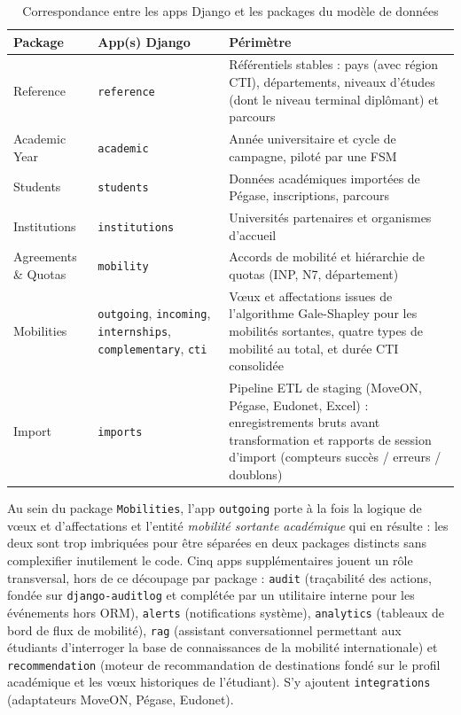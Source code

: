 \begin{table}[H]
\centering
\caption{Correspondance entre les apps Django et les packages du modèle de données}
\label{tab:domaines_apps}
\footnotesize
\renewcommand{\arraystretch}{1.4}
\begin{tabular}{|p{3.2cm}|p{3cm}|p{8.5cm}|}
\hline
\rowcolor{gray!20}
\textbf{Package} & \textbf{App(s) Django} & \textbf{Périmètre} \\
\hline
Reference & \texttt{reference} & Référentiels stables : pays (avec région CTI), départements, niveaux d'études (dont le niveau terminal diplômant) et parcours \\
\hline
Academic Year & \texttt{academic} & Année universitaire et cycle de campagne, piloté par une FSM \\
\hline
Students & \texttt{students} & Données académiques importées de Pégase, inscriptions, parcours \\
\hline
Institutions & \texttt{institutions} & Universités partenaires et organismes d'accueil \\
\hline
Agreements \& Quotas & \texttt{mobility} & Accords de mobilité et hiérarchie de quotas (INP, N7, département) \\
\hline
Mobilities & \texttt{outgoing}, \texttt{incoming}, \texttt{internships}, \texttt{complementary}, \texttt{cti} & Vœux et affectations issues de l'algorithme Gale-Shapley pour les mobilités sortantes, quatre types de mobilité au total, et durée CTI consolidée \\
\hline
Import & \texttt{imports} & Pipeline ETL de staging (MoveON, Pégase, Eudonet, Excel) : enregistrements bruts avant transformation et rapports de session d'import (compteurs succès / erreurs / doublons) \\
\hline
\end{tabular}
\end{table}

Au sein du package \texttt{Mobilities}, l'app \texttt{outgoing} porte à la fois la logique de vœux et d'affectations et l'entité \textit{mobilité sortante académique} qui en résulte : les deux sont trop imbriquées pour être séparées en deux packages distincts sans complexifier inutilement le code. Cinq apps supplémentaires jouent un rôle transversal, hors de ce découpage par package : \texttt{audit} (traçabilité des actions, fondée sur \texttt{django-auditlog} et complétée par un utilitaire interne pour les événements hors ORM), \texttt{alerts} (notifications système), \texttt{analytics} (tableaux de bord de flux de mobilité), \texttt{rag} (assistant conversationnel permettant aux étudiants d'interroger la base de connaissances de la mobilité internationale) et \texttt{recommendation} (moteur de recommandation de destinations fondé sur le profil académique et les vœux historiques de l'étudiant). S'y ajoutent \texttt{integrations} (adaptateurs MoveON, Pégase, Eudonet).

